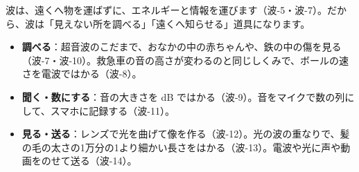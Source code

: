 波は、遠くへ物を運ばずに、エネルギーと情報を運びます（波-5・波-7）。だから、波は「見えない所を調べる」「遠くへ知らせる」道具になります。
\begin{itemize}[leftmargin=1.2\zw, itemsep=2pt, topsep=2pt, label={\color{bkTheme}●}]
\item \textbf{調べる}：超音波のこだまで、おなかの中の赤ちゃんや、鉄の中の傷を見る（波-7・波-10）。救急車の音の高さが変わるのと同じしくみで、ボールの速さを電波ではかる（波-8）。
\item \textbf{聞く・数にする}：音の大きさを dB ではかる（波-9）。音をマイクで数の列にして、スマホに記録する（波-11）。
\item \textbf{見る・送る}：レンズで光を曲げて像を作る（波-12）。光の波の重なりで、髪の毛の太さの1万分の1より細かい長さをはかる（波-13）。電波や光に声や動画をのせて送る（波-14）。
\end{itemize}

